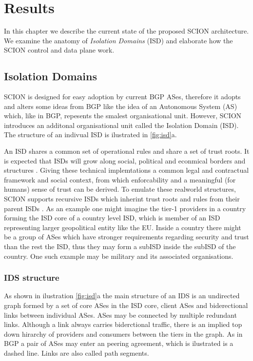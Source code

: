 \documentclass[../eva1_scion.tex]{subfiles}
\begin{document}
    \chapter{Results}
    In this chapter we describe the current state of the proposed SCION architecture. We examine the anatomy of \textit{Isolation Domains} (ISD) and elaborate how the SCION control and data plane work.

    \section{Isolation Domains}
    SCION is designed for easy adoption by current BGP ASes, therefore it adopts and alters some ideas from BGP like the idea of an Autonomous System (AS) which, like in BGP, repesents the smalest organisational unit. However, SCION introduces an additonal organisational unit called the Isolation Domain (ISD). The structure of an indivual ISD is ilustrated in \ref{fig:isd}a. 

    An ISD shares a common set of operational rules and share a set of trust roots. It is expected that ISDs will grow along social, political and econmical borders and structures \cite{scion_2011}. Giving these technical implemtations a common legal and contractual framework and social context, from which enforcability and a meaningful (for humans) sense of trust can be derived. To emulate these realworld structures, SCION supports recursive ISDs  which inherint trust roots and rules from their parent ISDs \cite{scion_2011}. As an example one might imagine the tier-1 providers in a country forming the ISD core of a country level ISD, which is member of an ISD representing larger geopolitical entity like the EU. Inside a country there might be a group of ASes which have stronger requirements regarding security and trust than the rest the ISD, thus they may form a subISD inside the subISD of the country. One such example may be military and its associated organisations.


    \subsection{IDS structure}
    As shown in ilustration \ref{fig:isd}a the main structure of an IDS is an undirected graph formed by a set of core ASes in the ISD core, client ASes and biderectional links between individual ASes. ASes may be connected by multiple redundant links. Although a link always carries biderctional traffic, there is an implied top down hirarchy of providers and consumers between the tiers in the graph. As in BGP a pair of ASes may enter an peering agreement, which is ilustrated is a dashed line. Links are also called path segments.
\end{document}

